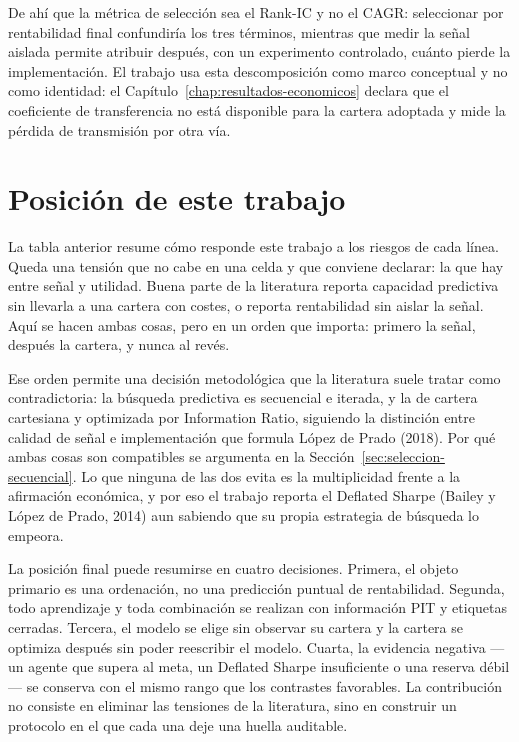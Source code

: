 De ahí que la métrica de selección sea el Rank-IC y no el CAGR: seleccionar por rentabilidad final
confundiría los tres términos, mientras que medir la señal aislada permite atribuir después, con un
experimento controlado, cuánto pierde la implementación. El trabajo usa esta descomposición como
marco conceptual y no como identidad: el Capítulo~\ref{chap:resultados-economicos} declara que el
coeficiente de transferencia no está disponible para la cartera adoptada y mide la pérdida de
transmisión por otra vía.

\section{Posición de este trabajo}

La tabla anterior resume cómo responde este trabajo a los riesgos de cada línea. Queda una tensión
que no cabe en una celda y que conviene declarar: la que hay entre señal y utilidad. Buena parte de
la literatura reporta capacidad predictiva sin llevarla a una cartera con costes, o reporta
rentabilidad sin aislar la señal. Aquí se hacen ambas cosas, pero en un orden que importa: primero
la señal, después la cartera, y nunca al revés.

Ese orden permite una decisión metodológica que la literatura suele tratar como contradictoria: la
búsqueda predictiva es secuencial e iterada, y la de cartera cartesiana y optimizada por Information
Ratio, siguiendo la distinción entre calidad de señal e implementación que formula López de Prado
(2018). Por qué ambas cosas son compatibles se argumenta en la
Sección~\ref{sec:seleccion-secuencial}. Lo que ninguna de las dos evita es la multiplicidad frente a
la afirmación económica, y por eso el trabajo reporta el Deflated Sharpe (Bailey y López de Prado,
2014) aun sabiendo que su propia estrategia de búsqueda lo empeora.

La posición final puede resumirse en cuatro decisiones. Primera, el objeto primario es una
ordenación, no una predicción puntual de rentabilidad. Segunda, todo aprendizaje y toda combinación
se realizan con información PIT y etiquetas cerradas. Tercera, el modelo se elige sin observar su
cartera y la cartera se optimiza después sin poder reescribir el modelo. Cuarta, la evidencia
negativa ---un agente que supera al meta, un Deflated Sharpe insuficiente o una reserva débil--- se
conserva con el mismo rango que los contrastes favorables. La contribución no consiste en eliminar
las tensiones de la literatura, sino en construir un protocolo en el que cada una deje una huella
auditable.
